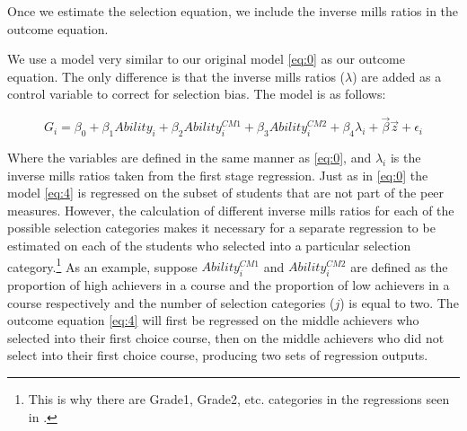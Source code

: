 \noindent Once we estimate the selection equation, we include the inverse mills ratios in the outcome equation.

We use a model very similar to our original model \eqref{eq:0} as our outcome equation. 
The only difference is that the inverse mills ratios ($\lambda$) are added as a control variable to correct for selection bias. 
The model is as follows:

\begin{equation}\label{eq:4}
G_{i} = \beta_{0} + \beta_{1} Ability_{i} + \beta_{2} Ability_{i}^{CM1} + \beta_{3} Ability_{i}^{CM2} + \beta_{4} \lambda_{i} + \overrightarrow{\beta} \overrightarrow{z} + \epsilon_{i}
\end{equation}

Where the variables are defined in the same manner as \eqref{eq:0}, and $\lambda_{i}$ is the inverse mills ratios taken from the first stage regression.
Just as in \eqref{eq:0} the model \eqref{eq:4} is regressed on the subset of students that are not part of the peer measures. 
However, the calculation of different inverse mills ratios for each of the possible selection categories makes it necessary for a separate regression to be estimated on each of the students who selected into a particular selection category.\footnote{This is why there are Grade1, Grade2, etc. categories in the regressions seen in .}
As an example, suppose $Ability_{i}^{CM1}$ and $Ability_{i}^{CM2}$ are defined as the proportion of high achievers in a course and the proportion of low achievers in a course respectively and the number of selection categories ($j$) is equal to two. 
The outcome equation \eqref{eq:4} will first be regressed on the middle achievers who selected into their first choice course, then on the middle achievers who did not select into their first choice course, producing two sets of regression outputs. 